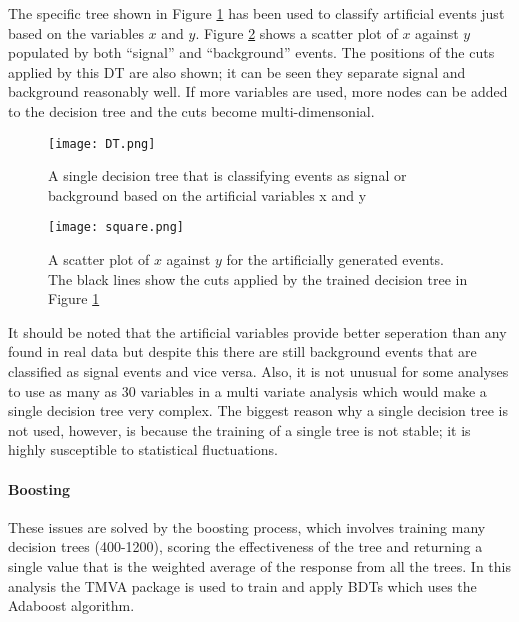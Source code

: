 The specific tree shown in Figure \ref{fig:DT} has been used to classify artificial events just based on the variables $x$ and $y$.  Figure \ref{fig:square} shows a scatter plot of $x$ against $y$ populated by both ``signal'' and ``background'' events.  The positions of the cuts applied by this DT are also shown; it can be seen they separate signal and background reasonably well.  If more variables are used, more nodes can be added to the decision tree and the cuts become multi-dimensonial.
\begin{figure}[h]
  \centering
  \texttt{[image: DT.png]}
  \caption{A single decision tree that is classifying events as signal or background based on the artificial variables x and y}
  \label{fig:DT}
\end{figure}
\begin{figure}[h]
  \centering
  \texttt{[image: square.png]}
  \caption{A scatter plot of $x$ against $y$ for the artificially generated events. The black lines show the cuts applied by the trained decision tree in Figure \ref{fig:DT}}
  \label{fig:square}
\end{figure}

It should be noted that the artificial variables provide better seperation than any found in real data but despite this there are still background events that are classified as signal events and vice versa. Also, it is not unusual for some analyses to use as many as 30 variables in a multi variate analysis which would make a single decision tree very complex.  The biggest reason why a single decision tree is not used, however, is because the training of a single tree is not stable; it is highly susceptible to statistical fluctuations.

\paragraph{Boosting}
These issues are solved by the boosting process, which involves training many decision trees (400-1200), scoring the effectiveness of the tree and returning a single value that is the weighted average of the response from all the trees.  In this analysis the TMVA package is used to train and apply BDTs which uses the Adaboost algorithm\cite{Hocker:2007ht}. 

